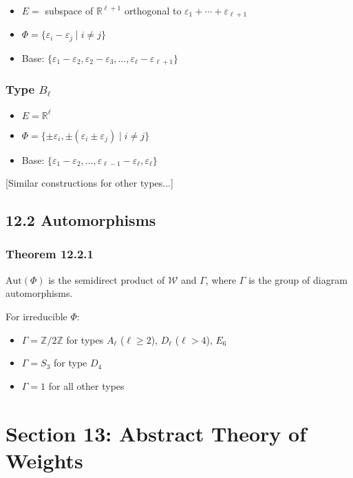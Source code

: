 \begin{itemize}
	\item $E = $ subspace of $\mathbb{R}^{\ell+1}$ orthogonal to $\varepsilon_1 + \cdots + \varepsilon_{\ell+1}$
	\item $\Phi = \{\varepsilon_i - \varepsilon_j \mid i \neq j\}$
	\item Base: $\{\varepsilon_1 - \varepsilon_2, \varepsilon_2 - \varepsilon_3, \ldots, \varepsilon_\ell - \varepsilon_{\ell+1}\}$
\end{itemize}

\subsubsection{Type \texorpdfstring{$B_\ell$}{B_ell}}

\begin{itemize}
	\item $E = \mathbb{R}^\ell$
	\item $\Phi = \{\pm\varepsilon_i, \pm(\varepsilon_i \pm \varepsilon_j) \mid i \neq j\}$
	\item Base: $\{\varepsilon_1 - \varepsilon_2, \ldots, \varepsilon_{\ell-1} - \varepsilon_\ell, \varepsilon_\ell\}$
\end{itemize}

[Similar constructions for other types...]

\subsection{12.2 Automorphisms}

\subsubsection{Theorem 12.2.1}

$\text{Aut}(\Phi)$ is the semidirect product of $\mathcal{W}$ and $\Gamma$, where $\Gamma$ is the group of diagram automorphisms.

For irreducible $\Phi$:

\begin{itemize}
	\item $\Gamma = \mathbb{Z}/2\mathbb{Z}$ for types $A_\ell$ ($\ell \geq 2$), $D_\ell$ ($\ell > 4$), $E_6$
	\item $\Gamma = S_3$ for type $D_4$
	\item $\Gamma = 1$ for all other types
\end{itemize}


\section{Section 13: Abstract Theory of Weights}

